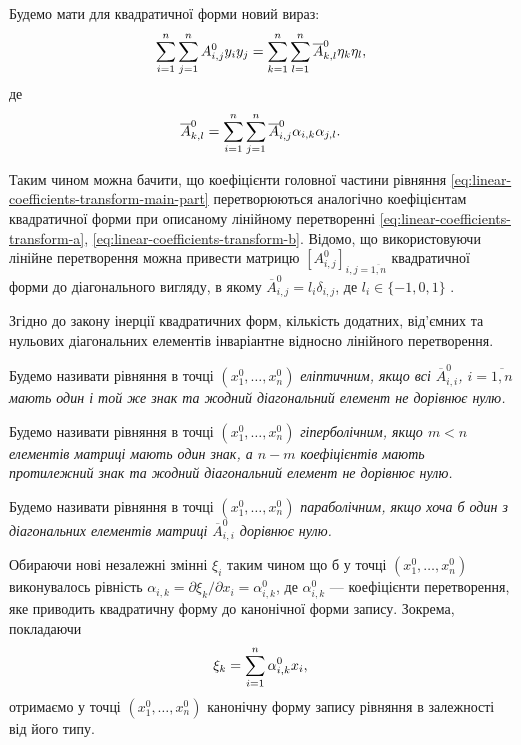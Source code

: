 Будемо мати для квадратичної форми новий вираз:
\begin{equation}
	\displaystyle\sum\limits_{i=1}^n \displaystyle\sum\limits_{j=1}^n A_{i,j}^0 y_iy_j = \displaystyle\sum\limits_{k=1}^n\displaystyle\sum\limits_{l=1}^n \overline{A}_{k,l}^0 \eta_k \eta_l,
\end{equation}
де 
\begin{equation}
	\label{eq:linear-coefficients-transform-main-part}
	\overline{A}_{k,l}^0 = \displaystyle\sum\limits_{i=1}^n \displaystyle\sum\limits_{j=1}^n \overline{A}_{i,j}^0 \alpha_{i,k}\alpha_{j,l}.
\end{equation}

Таким чином можна бачити, що коефіцієнти головної частини рівняння \eqref{eq:linear-coefficients-transform-main-part} перетворюються аналогічно коефіцієнтам квадратичної форми при описаному лінійному перетворенні \eqref{eq:linear-coefficients-transform-a}, \eqref{eq:linear-coefficients-transform-b}. Відомо, що використовуючи лінійне перетворення можна привести матрицю $\left[A_{i,j}^0\right]_{i,j=\overline{1,n}}$ квадратичної форми до діагонального вигляду, в якому $\overline{A}_{i,j}^0 = l_i\delta_{i,j}$, де  $l_i \in \{-1,0,1\}$  . \medskip

Згідно до закону інерції квадратичних форм, кількість додатних, від'ємних та нульових діагональних елементів інваріантне відносно лінійного перетворення.

\begin{definition}
	Будемо називати рівняння в точці $(x_1^0,\ldots,x_n^0)$ \it{еліптичним}, якщо всі $\overline{A}_{i,i}^0$, $i=\overline{1,n}$ мають один і той же знак  та жодний діагональний елемент не дорівнює нулю. 
\end{definition}

\begin{definition}
	Будемо називати рівняння в точці $(x_1^0,\ldots,x_n^0)$ \it{гіперболічним}, якщо $m < n$ елементів матриці мають один знак, а $n - m$ коефіцієнтів мають протилежний знак та жодний діагональний елемент не дорівнює нулю. 
\end{definition}

\begin{definition}
	Будемо називати рівняння в точці $(x_1^0,\ldots,x_n^0)$ \it{параболічним}, якщо хоча б один з діагональних елементів матриці $\overline{A}_{i,i}^0$ дорівнює нулю. 
\end{definition}

Обираючи нові незалежні змінні $\xi_i$ таким чином що б у точці $(x_1^0,\ldots,x_n^0)$ виконувалось рівність $\alpha_{i,k}= \partial \xi_k / \partial x_i = \alpha_{i,k}^0$, де $\alpha_{i,k}^0$ --- коефіцієнти перетворення, яке приводить квадратичну форму до канонічної форми запису. Зокрема, покладаючи
\begin{equation}
	\xi_k = \displaystyle\sum\limits_{i=1}^n \alpha_{i,k}^0 x_i,
\end{equation}
отримаємо у точці $(x_1^0,\ldots,x_n^0)$ канонічну форму запису рівняння в залежності від його типу.

